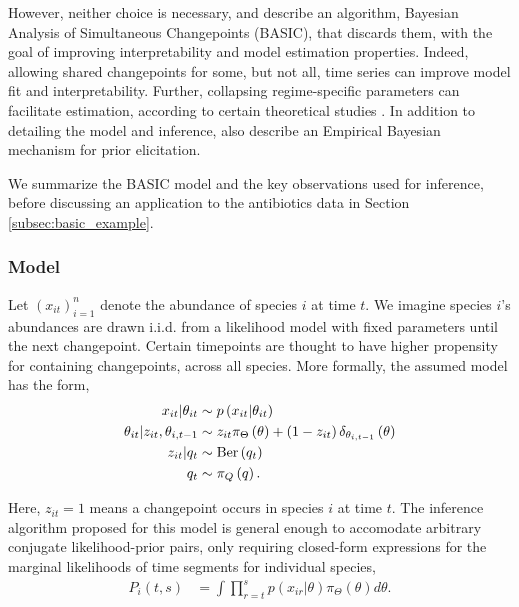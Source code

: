 However, neither choice is necessary, and \cite{fan2015empirical} describe an
algorithm, Bayesian Analysis of Simultaneous Changepoints (BASIC), that discards
them, with the goal of improving interpretability and model estimation
properties. Indeed, allowing shared changepoints for some, but not all, time
series can improve model fit and interpretability. Further, collapsing
regime-specific parameters can facilitate estimation, according to certain
theoretical studies \citep{liu1994collapsed}. In addition to detailing the model
and inference, \cite{fan2015empirical} also describe an Empirical Bayesian
mechanism for prior elicitation.

We summarize the BASIC model and the key observations used for inference, before
discussing an application to the antibiotics data in Section
\ref{subsec:basic_example}.

\subsubsection{Model}
\label{subsec:basic_model}

Let $\left(x_{it}\right)_{i = 1}^{n}$ denote the abundance of species $i$ at
time $t$. We imagine species $i$'s abundances are drawn i.i.d. from a likelihood
model with fixed parameters until the next changepoint. Certain timepoints are
thought to have higher propensity for containing changepoints, across all
species. More formally, the assumed model has the form,
\begin{align*}
  x_{it} \vert \theta_{it} &\sim p\left(x_{it} \vert \theta_{it}\right) \\
  \theta_{it} \vert z_{it}, \theta_{i,t - 1} &\sim z_{it}\pi_{\Theta}\left(\theta\right) + \left(1 - z_{it}\right) \delta_{\theta_{i, t - 1}}\left(\theta\right) \\
  z_{it} \vert q_{t} &\sim \textnormal{Ber}\left(q_{t}\right) \\
  q_t &\sim \pi_{Q}\left(q\right).
\end{align*}

Here, $z_{it} = 1$ means a changepoint occurs in species $i$ at time $t$. The
inference algorithm proposed for this model is general enough to accomodate
arbitrary conjugate likelihood-prior pairs, only requiring closed-form
expressions for the marginal likelihoods of time segments for individual
species,
\begin{align*}
  P_i\left(t, s\right) &= \int \prod_{r = t}^{s} p\left(x_{ir} \vert \theta\right) \pi_{\Theta}\left(\theta\right) d\theta.
\end{align*}

